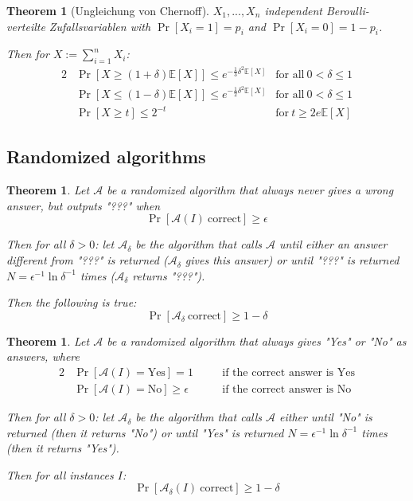 \documentclass[12pt]{extarticle}
\theoremstyle{definition}
\theoremstyle{remark}
\theoremstyle{plain}
\newtheorem{theorem}[definition]{Theorem}
\theoremstyle{plain}
\theoremstyle{plain}
\newcommand{\E}{\mathbb{E}}
\begin{document}
\begin{theorem}[Ungleichung von Chernoff]
    $X_1, ..., X_n$ independent Beroulli-verteilte Zufallsvariablen with $\Pr[X_i = 1] = p_i$ and $\Pr[X_i = 0] = 1 - p_i$.

    Then for $X := \sum_{i=1}^n X_i$:
    \begin{alignat}{2}
         & \Pr[X \ge (1 + \delta)\E[X]] \le e^{-\frac{1}{3} \delta^2 \E[X]} & \mbox{for all}\ 0 < \delta \le 1 \\
         & \Pr[X \le (1 - \delta)\E[X]] \le e^{-\frac{1}{2} \delta^2 \E[X]} & \mbox{for all}\ 0 < \delta \le 1 \\
         & \Pr[X \ge t] \le 2^{-t}                                          & \mbox{for}\ t \ge 2e \E[X]
    \end{alignat}
\end{theorem}

\subsection{Randomized algorithms}
\begin{theorem}
    Let $\mathcal{A}$ be a randomized algorithm that always never gives a wrong answer, but outputs "???" when
    \[ \Pr[\mathcal{A}(I)\ \mbox{correct}] \ge \epsilon \]

    Then for all $\delta > 0$:
    let $\mathcal{A}_\delta$ be the algorithm that calls $\mathcal{A}$ until either an answer different from "???" is returned ($\mathcal{A}_\delta$ gives
    this answer) or until "???" is returned $N = \epsilon^{-1} \ln \delta^{-1}$ times ($\mathcal{A}_\delta$ returns "???").

    Then the following is true:
    \[ \Pr[\mathcal{A}_\delta\ \mbox{correct}] \ge 1 - \delta \]
\end{theorem}

\begin{theorem}
    Let $\mathcal{A}$ be a randomized algorithm that always gives "Yes" or "No" as answers, where
    \begin{alignat}{2}
         & \Pr[\mathcal{A}(I) = \mbox{Yes}] = 1         &  & \quad\mbox{if the correct answer is Yes} \\
         & \Pr[\mathcal{A}(I) = \mbox{No}] \ge \epsilon &  & \quad\mbox{if the correct answer is No}
    \end{alignat}

    Then for all $\delta > 0$: let $\mathcal{A}_\delta$ be the algorithm that calls $\mathcal{A}$ either until "No" is returned
    (then it returns "No") or until "Yes" is returned $N = \epsilon^{-1} \ln \delta^{-1}$ times (then it returns "Yes").

    Then for all instances $I$:
    \[ \Pr[\mathcal{A}_\delta(I)\ \mbox{correct}] \ge 1 - \delta \]
\end{theorem}
\end{document}
